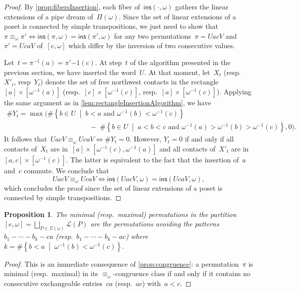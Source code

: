 \documentclass{amsart}
\newtheorem{proposition}[theorem]{Proposition}
\theoremstyle{definition}
\newcommand{\set}[2]{\left\{ #1 \;\middle|\; #2 \right\}} %
\newcommand{\pipeDreams}{\Pi} %
\newcommand{\insertion}[2]{\mathsf{ins}(#1,#2)} %
\newcommand{\acyclicPipeDreams}{\Sigma} %
\newcommand{\linearExtensions}{\mathcal{L}} %
\begin{document}
\begin{proof}
By \cref{prop:fibersInsertion}, each fiber of~$\insertion{\cdot}{\omega}$ gathers the linear extensions of a pipe dream of~$\pipeDreams(\omega)$.
Since the set of linear extensions of a poset is connected by simple transpositions, we just need to show that~$\pi \equiv_\omega \pi' \!\iff\! \insertion{\pi}{\omega} = \insertion{\pi'}{\omega}$ for any two permutations~$\pi = UacV$ and~$\pi' = UcaV$ of~$[e,\omega]$ which differ by the inversion of two consecutive values.

Let~$t = \pi^{-1}(a) = \pi'{-1}(c)$.
At step~$t$ of the algorithm presented in the previous section, we have inserted the word~$U$.
At that moment, let~$X_t$ (resp.~$X'_t$, resp~$Y_t$) denote the set of free northwest contacts in the rectangle~$[a] \times [\omega^{-1}(a)]$ (resp.~$[c] \times [\omega^{-1}(c)]$, resp.~$[a] \times [\omega^{-1}(c)]$).
Applying the same argument as in \cref{lem:rectangleInsertionAlgorithm}, we have
\begin{gather*}
\# Y_t = \max\big( \#\set{b \in U}{b < a \text{ and } \omega^{-1}(b) < \omega^{-1}(c)} \hspace{5cm} \\ \hspace{5cm} - \; \#\set{b \in U}{a < b < c \text{ and } \omega^{-1}(a) > \omega^{-1}(b) > \omega^{-1}(c)}, 0\big).
\end{gather*}
It follows that~$U ac V \equiv_\omega U ca V \iff \# Y_t = 0$.
However, $Y_t = 0$ if and only if all contacts of~$X_t$ are in~$[a] \times [\omega^{-1}(c), \omega^{-1}(a)]$ and all contacts of~$X'_t$ are in~$[a,c] \times [\omega^{-1}(c)]$.
The latter is equivalent to the fact that the insertion of~$a$ and~$c$ commute.
We conclude that
\[
U ac V \equiv_\omega U ca V \iff \insertion{UacV}{\omega} = \insertion{UcaV}{\omega},
\]
which concludes the proof since the set of linear extensions of a poset is connected by simple transpositions.
\end{proof}

\begin{proposition}
\label{prop:patternAvoiding}
The minimal (resp.~maximal) permutations in the partition
\(
{[e,\omega] = \bigsqcup_{P \in \acyclicPipeDreams(\omega)} \linearExtensions(P)}
\)
are the permutations avoiding the patterns~$b_1 - \cdots - b_k - ca$ (resp.~$b_1 - \cdots - b_k - ac$) where $k = \#\set{b < a}{\omega^{-1}(b) < \omega^{-1}(c)}$.
\end{proposition}

\begin{proof}
This is an immediate consequence of \cref{prop:congruence}: a permutation~$\pi$ is minimal (resp.~maximal) in its $\equiv_\omega$-congruence class if and only if it contains no consecutive exchangeable entries~$ca$ (resp.~$ac$) with~$a < c$.
\end{proof}
\end{document}
